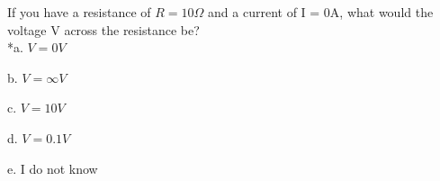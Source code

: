 
If you have a resistance of \( R = 10 \Omega \) and a current of I = 0A, what would the voltage V across the resistance be? \\

*a. \( V = 0V \)

b. \( V = \infty V \)

c. \( V = 10V \) 

d. \( V = 0.1V \)

e. I do not know \\
